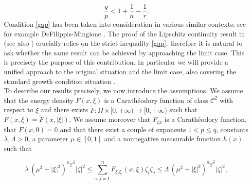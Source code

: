 \documentclass[12pt]{amsart}
\theoremstyle{definition}
\numberwithin{equation}{section}
\numberwithin{equation}{section}
\begin{document}
{\begin{equation}
\label{gap}
\frac{q}{p} < 1 + \frac{1}{n} - \frac{1}{r}.
\end{equation}
Condition \eqref{gap} has been taken into consideration in various similar contexts; see for example DeFilippis-Mingione \cite{DFM2020}.
{The proof of the Lipschitz continuity result in \cite{EMM16} (see also \cite{EMM3, DFM}) crucially relies on the strict inequality \eqref{gap}, therefore it is natural to ask whether the same result can be achieved by approaching the limit case. 
This is precisely the purpose of this contribution. In particular we will  provide a unified approach to the original situation and the limit case, also covering the standard growth condition situation \cite{CGHPdN20}}.
\\
To  describe our results  precisely, we  now introduce the assumptions.
We  assume that the energy density $F(x, \xi)$ is a Carath\'eodory function of class $\mathcal{C}^2$ with respect to  $\xi$ and   there exists $\tilde F:\Omega\times [0,+\infty)\mapsto [0,+\infty)$ such that $F(x, \xi)= \tilde F(x,|\xi|)$. We assume moreover that $F_{\xi x}$ is a  Carath\'eodory function, that $F(x,0)=0$ and that there exist a couple of exponents $1<p\le q$,  constants $\lambda,\Lambda>0$, a parameter $\mu\in [0,1]$ and a nonnegative measurable function $h(x)$ such that 

\begin{equation}\label{(F2)(F3)}\lambda \, (\mu^2 + |\xi|^2)^{\frac{p-2}{2}} |\zeta|^2 \le \sum_{i,j = 1}^n F_{\xi_i \xi_j} (x, \xi) \zeta_i \zeta_j\le \Lambda \, (\mu^2 + |\xi|^2)^{\frac{q-2}{2}}|\zeta|^2, \end{equation}

}
\end{document}
